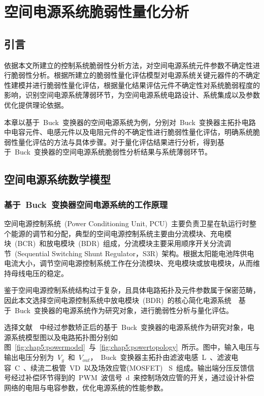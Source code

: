 \chapter{空间电源系统脆弱性量化分析}
\label{cha:Test}
\section{引言}
\label{sec:chap5:int}
依据本文所建立的控制系统脆弱性分析方法，对空间电源系统元件参数不确定性进行脆弱性分析。根据所建立的脆弱性量化评估模型对电源系统关键元器件的不确定性建模并进行脆弱性量化评估，根据量化结果评估元件不确定性对系统脆弱程度的影响，识别空间电源系统薄弱环节，为空间电源系统电路设计、系统集成以及参数优化提供理论依据。

本章以基于~Buck~变换器的空间电源系统为例，分别对~Buck~变换器主拓扑电路中电容元件、电感元件以及电阻元件的不确定性进行脆弱性量化评估，明确系统脆弱性量化评估的方法与具体步骤。对于量化评估结果进行分析，得到基于~Buck~变换器的空间电源系统脆弱性分析结果与系统薄弱环节。

\section{空间电源系统数学模型}
\label{sec:chap5:condition}
\subsection{基于~Buck~变换器空间电源系统的工作原理}
\label{sub:chap5:environment}
空间电源控制系统~(Power Conditioning Unit, PCU)~主要负责卫星在轨运行时整个能源的调节和分配，典型的空间电源控制系统主要由分流模块、充电模块~(BCR)~和放电模块~(BDR)~组成，分流模块主要采用顺序开关分流调节~(Sequential Switching Shunt Regulator，S3R)~架构\cite{Xin2007S3R,Rouzies2015Analysis,Guo2010SpacePower,Wang2012Development}。根据太阳能电池阵供电电流大小，调节空间电源控制系统工作在分流模块、充电模块或放电模块，从而维持母线电压的稳定。

鉴于空间电源控制系统结构过于复杂，且具体电路拓扑及元件参数属于保密范畴，因此本文选择空间电源控制系统中放电模块~(BDR)~的核心简化电源系统~\raisebox{0.5mm}{------}~基于~Buck~变换器的电源系统作为研究对象，进行脆弱性分析与量化评估。

选择文献~\cite{BuckXu}~中经过参数矫正后的基于~Buck~变换器的电源系统作为研究对象，电源系统模型图以及电路拓扑图分别如图~\ref{fig:chap5:powermodel}~与~\ref{fig:chap5:powertopology}~所示。图中，输入电压与输出电压分别为~$V_{g}$~和~$V_{out}$，~Buck~变换器主拓扑由滤波电感~L~、滤波电容~C~、续流二极管~VD~以及场效应管(MOSFET)~ S~组成。输出端分压反馈信号经过补偿环节得到的~PWM~波信号~d~来控制场效应管的开关，通过设计补偿网络的电阻与电容参数，优化电源系统的性能参数。

